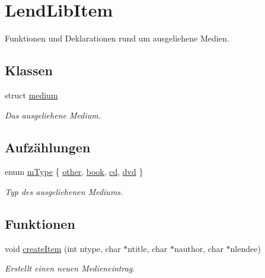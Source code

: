 \hypertarget{group___lend_lib_item}{}\section{Lend\+Lib\+Item}
\label{group___lend_lib_item}


Funktionen und Deklarationen rund um ausgeliehene Medien.  


\subsection*{Klassen}
\begin{DoxyCompactItemize}
\item 
struct \hyperlink{structmedium}{medium}
\begin{DoxyCompactList}\small\item\em Das ausgeliehene Medium. \end{DoxyCompactList}\end{DoxyCompactItemize}
\subsection*{Aufzählungen}
\begin{DoxyCompactItemize}
\item 
enum \hyperlink{group___lend_lib_item_ga636cfca014f3212ea82d45e28f9cb51b}{m\+Type} \{ \hyperlink{group___lend_lib_item_gga636cfca014f3212ea82d45e28f9cb51ba7e338ad381a84ef6df07e7d425707025}{other}, 
\hyperlink{group___lend_lib_item_gga636cfca014f3212ea82d45e28f9cb51ba6053cbf2a0d801307c80aec065560db6}{book}, 
\hyperlink{group___lend_lib_item_gga636cfca014f3212ea82d45e28f9cb51bae7dab93ee81e7f74327bed188e6f3748}{cd}, 
\hyperlink{group___lend_lib_item_gga636cfca014f3212ea82d45e28f9cb51ba9250e48899d18438f51e7df957e35ea5}{dvd}
 \}\begin{DoxyCompactList}\small\item\em Typ des ausgeliehenen Mediums. \end{DoxyCompactList}
\end{DoxyCompactItemize}
\subsection*{Funktionen}
\begin{DoxyCompactItemize}
\item 
void \hyperlink{group___lend_lib_item_gae4830b667e3f2426781bd4a10b2bc3fa}{create\+Item} (int ntype, char $\ast$ntitle, char $\ast$nauthor, char $\ast$nlendee)
\begin{DoxyCompactList}\small\item\em Erstellt einen neuen Medieneintrag. \end{DoxyCompactList}\end{DoxyCompactItemize}


